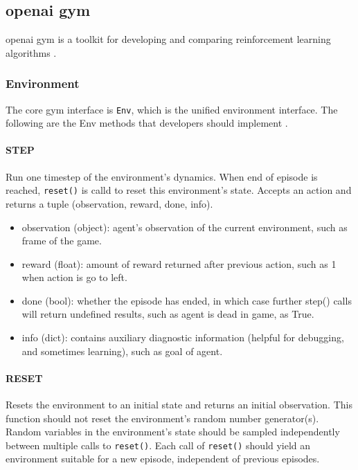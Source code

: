 \subsection{\gls{openai gym}}
\gls{openai gym} is a toolkit for developing and comparing reinforcement learning algorithms \parencite{brockman2016openai}.
\subsubsection{Environment}
The core gym interface is \texttt{Env}, which is the unified environment interface. The following are the Env methods that developers should implement \parencite{brockman2016openai}.

\paragraph{STEP} Run one timestep of the environment's dynamics. When end of episode is reached, \texttt{reset()} is calld to reset this environment's state. Accepts an action and returns a tuple (observation, reward, done, info).
\begin{itemize}
\item observation (object): agent's observation of the current environment, such as frame of the game.
\item reward (float): amount of reward returned after previous action, such as 1 when action is go to left.
\item done (bool): whether the episode has ended, in which case further step() calls will return undefined results, such as agent is dead in game, as True.
\item info (dict): contains auxiliary diagnostic information (helpful for debugging, and sometimes learning), such as goal of agent.
\end{itemize}

\paragraph{RESET} Resets the environment to an initial state and returns an initial observation. This function should not reset the environment's random number generator(s). Random variables in the environment's state should be sampled independently between multiple calls to \texttt{reset()}. Each call of \texttt{reset()} should yield an environment suitable for a new episode, independent of previous episodes.
